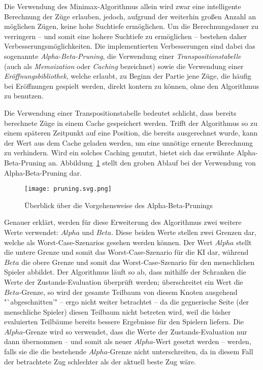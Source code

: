 Die Verwendung des Minimax-Algorithmus allein wird zwar eine intelligente Berechnung der Züge erlauben, jedoch, aufgrund der weiterhin großen Anzahl an möglichen Zügen, keine hohe Suchtiefe ermöglichen. Um die Berechnungsdauer zu verringern -- und somit eine hohere Suchtiefe zu ermöglichen -- bestehen daher Verbesserungsmöglichkeiten. Die implementierten Verbesserungen sind dabei das sogenannte \textit{Alpha-Beta-Pruning}, die Verwendung einer \textit{Transpositionstabelle} (auch als \textit{Memoization} oder \textit{Caching} bezeichnet) sowie die Verwendung einer \textit{Eröffnungsbibliothek}, welche erlaubt, zu Beginn der Partie jene Züge, die häufig bei Eröffnungen gespielt werden, direkt kontern zu können, ohne den Algorithmus zu benutzen.

Die Verwendung einer Transpositionstabelle bedeutet schlicht, dass bereits berechnete Züge in einem Cache gespeichert werden. Trifft der Algorithmus so zu einem späteren Zeitpunkt auf eine Position, die bereits ausgerechnet wurde, kann der Wert aus dem Cache geladen werden, um eine unnötige erneute Berechnung zu verhindern. Wird ein solches Caching genutzt, bietet sich das erwähnte Alpha-Beta-Pruning an. Abbildung~\ref{fig:pruning} stellt den groben Ablauf bei der Verwendung von Alpha-Beta-Pruning dar.

\begin{figure}[H]
	\texttt{[image: pruning.svg.png]}
	\caption{Überblick über die Vorgehensweise des Alpha-Beta-Prunings\footnotemark}
	\label{fig:pruning}
\end{figure}

Genauer erklärt, werden für diese Erweiterung des Algorithmus zwei weitere Werte verwendet: $Alpha$ und $Beta$. Diese beiden Werte stellen zwei Grenzen dar, welche als Worst-Case-Szenarios gesehen werden können. Der Wert $Alpha$ stellt die untere Grenze und somit das Worst-Case-Szenario für die KI dar, während $Beta$ die obere Grenze und somit das Worst-Case-Szenario für den menschlichen Spieler abbildet. Der Algorithmus läuft so ab, dass mithilfe der Schranken die Werte der Zustands-Evaluation überprüft werden; überschreitet ein Wert die $Beta$-Grenze, so wird der gesamte Teilbaum von diesem Knoten ausgehend "`abgeschnitten'" -- ergo nicht weiter betrachtet -- da die gegnerische Seite (der menschliche Spieler) diesen Teilbaum nicht betreten wird, weil die bisher evaluierten Teilbäume bereits bessere Ergebnisse für den Spielern liefern. Die $Alpha$-Grenze wird so verwendet, dass die Werte der Zustands-Evaluation nur dann übernommen -- und somit als neuer $Alpha$-Wert gesetzt werden -- werden, falls sie die die bestehende $Alpha$-Grenze nicht unterschreiten, da in diesem Fall der betrachtete Zug schlechter als der aktuell beste Zug wäre.

